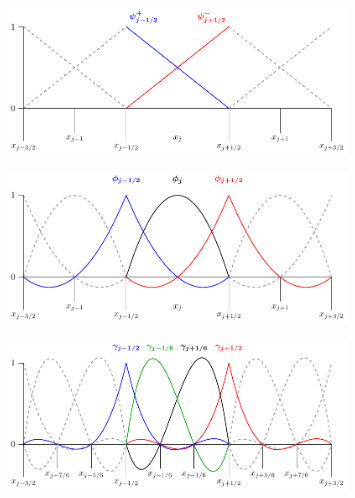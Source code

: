 \documentclass[a4paper,12pt]{book}
\begin{document}
	\begin{figure}
		\centering
		\includegraphics[width=0.8\textwidth]{P1.pdf}
	\end{figure}	
	\begin{figure}
		\centering
		\includegraphics[width=0.8\textwidth]{P2.pdf}
	\end{figure}
\begin{figure}
	\centering
	\includegraphics[width=0.8\textwidth]{P3.pdf}
\end{figure}
\end{document}
